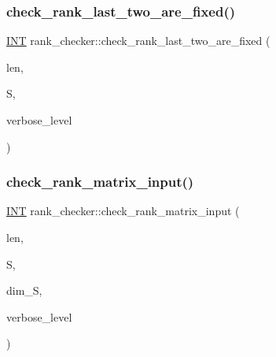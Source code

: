 \mbox{\label{classrank__checker_a1a55c9b22e1891e820e475e9e97daf12}} 
\subsubsection{\texorpdfstring{check\+\_\+rank\+\_\+last\+\_\+two\+\_\+are\+\_\+fixed()}{check\_rank\_last\_two\_are\_fixed()}}
{\footnotesize\ttfamily \mbox{\hyperlink{galois_8h_a09fddde158a3a20bd2dcadb609de11dc}{I\+NT}} rank\+\_\+checker\+::check\+\_\+rank\+\_\+last\+\_\+two\+\_\+are\+\_\+fixed (\begin{DoxyParamCaption}\item[{\mbox{\hyperlink{galois_8h_a09fddde158a3a20bd2dcadb609de11dc}{I\+NT}}}]{len,  }\item[{\mbox{\hyperlink{galois_8h_a09fddde158a3a20bd2dcadb609de11dc}{I\+NT}} $\ast$}]{S,  }\item[{\mbox{\hyperlink{galois_8h_a09fddde158a3a20bd2dcadb609de11dc}{I\+NT}}}]{verbose\+\_\+level }\end{DoxyParamCaption})}

\mbox{\label{classrank__checker_a09f9f9d8674b33f9e0c00a129347a2be}} 
\subsubsection{\texorpdfstring{check\+\_\+rank\+\_\+matrix\+\_\+input()}{check\_rank\_matrix\_input()}}
{\footnotesize\ttfamily \mbox{\hyperlink{galois_8h_a09fddde158a3a20bd2dcadb609de11dc}{I\+NT}} rank\+\_\+checker\+::check\+\_\+rank\+\_\+matrix\+\_\+input (\begin{DoxyParamCaption}\item[{\mbox{\hyperlink{galois_8h_a09fddde158a3a20bd2dcadb609de11dc}{I\+NT}}}]{len,  }\item[{\mbox{\hyperlink{galois_8h_a09fddde158a3a20bd2dcadb609de11dc}{I\+NT}} $\ast$}]{S,  }\item[{\mbox{\hyperlink{galois_8h_a09fddde158a3a20bd2dcadb609de11dc}{I\+NT}}}]{dim\+\_\+S,  }\item[{\mbox{\hyperlink{galois_8h_a09fddde158a3a20bd2dcadb609de11dc}{I\+NT}}}]{verbose\+\_\+level }\end{DoxyParamCaption})}

